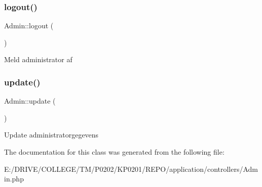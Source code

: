 \subsubsection{\texorpdfstring{logout()}{logout()}}
{\footnotesize\ttfamily Admin\+::logout (\begin{DoxyParamCaption}{ }\end{DoxyParamCaption})}

Meld administrator af \mbox{\label{class_admin_a5c7b585615c86fd80fe4b2dd8e282da0}} 
\subsubsection{\texorpdfstring{update()}{update()}}
{\footnotesize\ttfamily Admin\+::update (\begin{DoxyParamCaption}{ }\end{DoxyParamCaption})}

Update administratorgegevens 

The documentation for this class was generated from the following file\+:\begin{DoxyCompactItemize}
\item 
E\+:/\+D\+R\+I\+V\+E/\+C\+O\+L\+L\+E\+G\+E/\+T\+M/\+P0202/\+K\+P0201/\+R\+E\+P\+O/application/controllers/Admin.\+php\end{DoxyCompactItemize}
